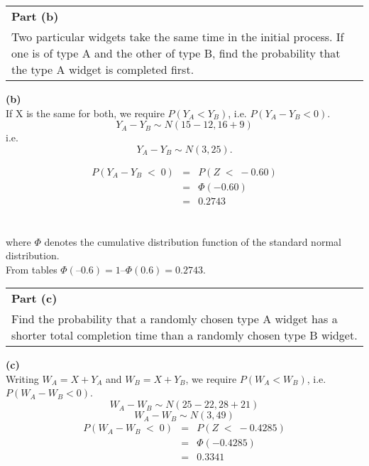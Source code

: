 \documentclass[a4paper,12pt]{article}
\begin{document}
	
	\begin{table}
		\begin{tabular}{|p{15cm}|}
			\hline \large
			\noindent  \textbf{Part (b)}\\
			\large
			Two particular widgets take the same time in the initial process. If one is of
			type A and the other of type B, find the probability that the type A widget is
			completed first.
			\\ \hline
		\end{tabular}
	\end{table}
	
	\vspace{0.8cm}
	\noindent \textbf{(b)}\\
	If X is the same for both, we require $P(Y_A < Y_B)$, i.e. $P(Y_A - Y_B < 0)$.
	\[Y_A - Y_B \sim N(15 - 12 , 16 + 9)\] i.e. \[Y_A - Y_B \sim N(3, 25).\]
	
	\begin{eqnarray*}
		P(Y_A -Y_B \;<\; 0) &=& P(Z \;<\; -0.60) \\
		&=& \Phi(-0.60) \\
		&=& 0.2743\\
	\end{eqnarray*} 
	
	\noindent where $\Phi$ denotes the cumulative distribution function of the standard normal
	distribution. \\
	
	\noindent From tables $\Phi(–0.6) = 1 – \Phi(0.6) = 0.2743$.
	
	\newpage
	\begin{table}
		\begin{tabular}{|p{15cm}|}
			\hline \large
			\noindent  \textbf{Part (c)}\\
			\large Find the probability that a randomly chosen type A widget has a shorter total
			completion time than a randomly chosen type B widget.
			\\ \hline
		\end{tabular}
	\end{table}
	
	\vspace{0.8cm}
	\noindent \textbf{(c)} \\ Writing $W_A = X + Y_A$ and $W_B = X + Y_B$, we require $P(W_A < W_B)$, i.e.
	$P(W_A - W_B < 0)$.
	\[W_A - W_B \sim N(25 - 22 , 28 + 21)\] 
	\[W_A - W_B \sim N(3, 49)\]
	\medskip
	\begin{eqnarray*}
		P(W_A -W_B \;<\; 0)   &=& P(Z \;<\; -0.4285) \\
		&=& \Phi(-0.4285) \\
		&=& 0.3341
	\end{eqnarray*}
	
\end{document}
